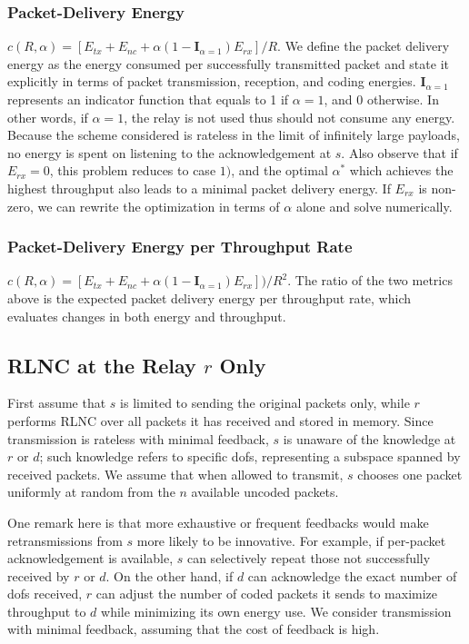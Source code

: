 \documentclass[journal, letterpaper]{IEEEtran}
\begin{document}
\subsubsection{Packet-Delivery Energy}\label{subsucsec:pktDevliveryE} $c(R,\alpha) = [E_{tx}+E_{nc}+\alpha (1 - \mathbf{I}_{\alpha=1})E_{rx}]/R$. We define the packet delivery energy as the energy consumed per successfully transmitted packet and state it explicitly in terms of packet transmission, reception, and coding energies. $\mathbf{I}_{\alpha=1}$ represents an indicator function that equals to 1 if $\alpha=1$, and 0 otherwise. In other words, if $\alpha=1$, the relay is not used thus should not consume any energy. Because the scheme considered is rateless in the limit of infinitely large payloads, no energy is spent on listening to the acknowledgement at $s$. Also observe that if $E_{rx} =0$, this problem reduces to case $1)$, and the optimal $\alpha^*$ which achieves the highest throughput also leads to a minimal packet delivery energy. If $E_{rx}$ is non-zero, we can rewrite the optimization in terms of $\alpha$ alone and solve numerically.

\subsubsection{Packet-Delivery Energy per Throughput Rate}\label{subsubsec:pktDeliveryEperThrpt}
$c(R,\alpha) = [E_{tx}+E_{nc}+\alpha (1 - \mathbf{I}_{\alpha=1})E_{rx}])/R^2$. The ratio of the two metrics above is the expected packet delivery energy per throughput rate, which evaluates changes in both energy and throughput.
\subsection{RLNC at the Relay $r$ Only}\label{subsec:r}
First assume that $s$ is limited to sending the original packets only, while $r$ performs RLNC over all packets it has received and stored in memory. Since transmission is rateless with minimal feedback, $s$ is unaware of the knowledge at $r$ or $d$; such knowledge refers to specific dofs, representing a subspace spanned by received packets. We assume that when allowed to transmit, $s$ chooses one packet uniformly at random from the $n$ available uncoded packets.

One remark here is that more exhaustive or frequent feedbacks would make retransmissions from $s$ more likely to be innovative. For example, if per-packet acknowledgement is available, $s$ can selectively repeat those not successfully received by $r$ or $d$. On the other hand, if $d$ can acknowledge the exact number of dofs received, $r$ can adjust the number of coded packets it sends to maximize throughput to $d$ while minimizing its own energy use. We consider transmission with minimal feedback, assuming that the cost of feedback is high.
\end{document}
